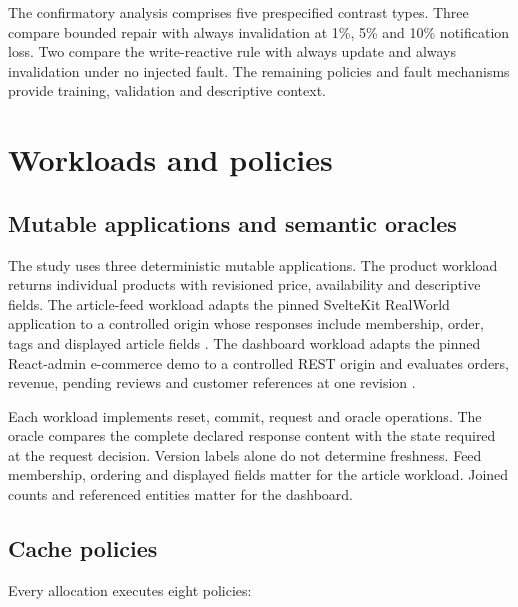 \documentclass[pdflatex,sn-mathphys-num]{sn-jnl}
\begin{document}
The confirmatory analysis comprises five prespecified contrast types. Three compare bounded repair with always invalidation at 1\%, 5\% and 10\% notification loss. Two compare the write-reactive rule with always update and always invalidation under no injected fault. The remaining policies and fault mechanisms provide training, validation and descriptive context.

\section{Workloads and policies}\label{workloads-and-policies}

\subsection{Mutable applications and semantic oracles}\label{mutable-applications-and-semantic-oracles}

The study uses three deterministic mutable applications. The product workload returns individual products with revisioned price, availability and descriptive fields. The article-feed workload adapts the pinned SvelteKit RealWorld application to a controlled origin whose responses include membership, order, tags and displayed article fields \citep{svelteRealWorld}. The dashboard workload adapts the pinned React-admin e-commerce demo to a controlled REST origin and evaluates orders, revenue, pending reviews and customer references at one revision \citep{reactAdminDemo}.

Each workload implements reset, commit, request and oracle operations. The oracle compares the complete declared response content with the state required at the request decision. Version labels alone do not determine freshness. Feed membership, ordering and displayed fields matter for the article workload. Joined counts and referenced entities matter for the dashboard.

\subsection{Cache policies}\label{cache-policies}

Every allocation executes eight policies:
\end{document}
